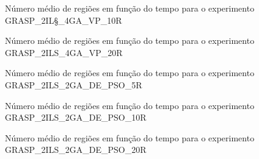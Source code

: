 \begin{apendicesenv}
\begin{figure}
    \centering
    \caption{Número médio de regiões em função do tempo para o experimento GRASP\_2IL\S_4GA\_VP\_10R}
    
\end{figure}

\begin{figure}
    \centering
    \caption{Número médio de regiões em função do tempo para o experimento GRASP\_2ILS\_4GA\_VP\_20R}
    
\end{figure}

\begin{figure}
    \centering
    \caption{Número médio de regiões em função do tempo para o experimento GRASP\_2ILS\_2GA\_DE\_PSO\_5R}
    
\end{figure}

\begin{figure}
    \centering
    \caption{Número médio de regiões em função do tempo para o experimento GRASP\_2ILS\_2GA\_DE\_PSO\_10R}
    
\end{figure}

\begin{figure}
    \centering
    \caption{Número médio de regiões em função do tempo para o experimento GRASP\_2ILS\_2GA\_DE\_PSO\_20R}
    
\end{figure}

\end{apendicesenv}

